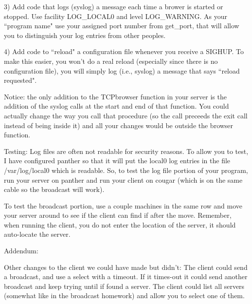 3) Add code that logs ({\ltt{}syslog}) a message each time a brower
is started or stopped. Use facility {\ltt{}LOG_LOCAL0}
and level {\ltt{}LOG_WARNING}.
As your ``program name" use your assigned port number from {\ltt{}get_port},
that will allow you to distinguish your log entries from other peoples.

4) Add code to ``reload" a configuration file whenever you
receive a {\ltt{}SIGHUP}.
To make this easier, you won't do a real reload (especially since
there is no configuration file), you will simply
log (i.e., {\ltt{}syslog}) a message that says ``reload requested".

Notice: the only addition to the {\ltt{}TCPbrowser} function in your server
is the addition of the {\ltt{}syslog} calls at the start and end of that
function.
You could actually change the way you call that procedure (so the call
preceeds the exit call instead of being inside it) and all your changes
would be outside the browser function.

Testing:
Log files are often not readable for security reasons.
To allow you to test,
I have configured {\ltt{}panther} so that it will put the {\ltt{}local0} log entries
in the file {\ltt{}/var/log/local0} which is readable.
So, to test the log file portion of your program, run your server on {\ltt{}panther} and run
your client on {\ltt{}cougar} (which is on the same cable so the
broadcast will work).

To test the broadcast portion, use a couple machines in the same row
and move your server around to see if the client can find if after
the move. Remember, when running the client, you do not enter the location
of the server, it should auto-locate the server.

Addendum:

Other changes to the client we could have made but didn't:
The client could send a broadcast, and use a select with a timeout.
If it times-out it could send another broadcast and keep trying until
if found a server.
The client could list all servers (somewhat like in the broadcast homework)
and allow you to select one of them.

\bye
